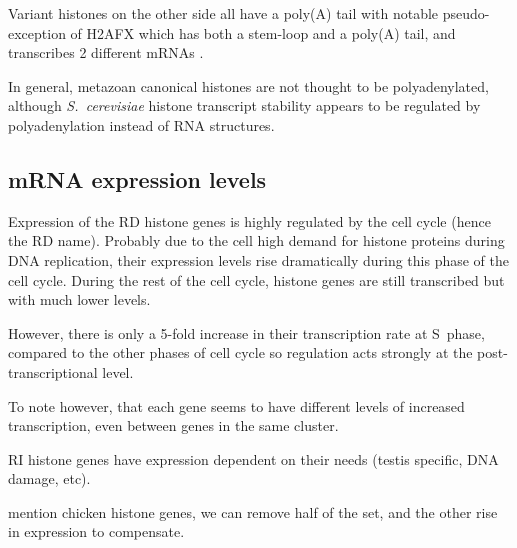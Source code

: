     Variant histones on the other side all have a poly(A) tail with notable
    pseudo-exception of H2AFX which has both a stem-loop and a poly(A) tail,
    and transcribes 2 different mRNAs \citep{HTwoAX-transcripts}.

    In general, metazoan canonical histones
    are not thought to be polyadenylated, although \textit{S.\ cerevisiae} histone transcript stability
    appears to be regulated by polyadenylation instead of RNA structures.

  \subsection{mRNA expression levels}
    Expression of the RD histone genes is highly regulated by the cell cycle (hence the RD name). Probably due
    to the cell high demand for histone proteins during DNA replication, their expression levels rise dramatically
    during this phase of the cell cycle. During the rest of the cell cycle, histone genes are still transcribed
    but with much lower levels.

    However, there is only a 5-fold increase in their transcription rate at S~phase, compared to the other phases
    of cell cycle so regulation acts strongly at the post-transcriptional level\addref.

    To note however, that each gene seems to have different levels of increased transcription, even between genes in the
    same cluster.

    RI histone genes have expression dependent on their needs (testis specific, DNA damage, etc).

    mention chicken histone genes, we can remove half of the set, and the other rise in expression to compensate.


